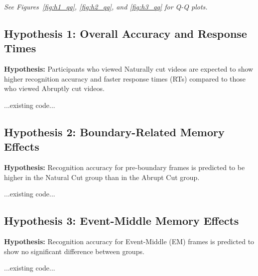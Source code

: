 \emph{See Figures~\ref{fig:h1_qq}, \ref{fig:h2_qq}, and \ref{fig:h3_qq} for Q-Q plots.}


\subsection{Hypothesis 1: Overall Accuracy and Response Times}
\textbf{Hypothesis:} Participants who viewed Naturally cut videos are expected to show higher recognition accuracy and faster response times (RTs) compared to those who viewed Abruptly cut videos.

...existing code...

\subsection{Hypothesis 2: Boundary-Related Memory Effects}
\textbf{Hypothesis:} Recognition accuracy for pre-boundary frames is predicted to be higher in the Natural Cut group than in the Abrupt Cut group.

...existing code...

\subsection{Hypothesis 3: Event-Middle Memory Effects}
\textbf{Hypothesis:} Recognition accuracy for Event-Middle (EM) frames is predicted to show no significant difference between groups.

...existing code...
